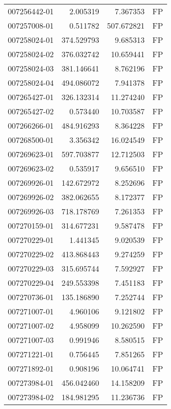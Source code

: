 \begin{tabular}{lrrl}
007256442-01 &    2.005319 &       7.367353 &   FP \\
007257008-01 &    0.511782 &     507.672821 &   FP \\
007258024-01 &  374.529793 &       9.685313 &   FP \\
007258024-02 &  376.032742 &      10.659441 &   FP \\
007258024-03 &  381.146641 &       8.762196 &   FP \\
007258024-04 &  494.086072 &       7.941378 &   FP \\
007265427-01 &  326.132314 &      11.274240 &   FP \\
007265427-02 &    0.573440 &      10.703587 &   FP \\
007266266-01 &  484.916293 &       8.364228 &   FP \\
007268500-01 &    3.356342 &      16.024549 &   FP \\
007269623-01 &  597.703877 &      12.712503 &   FP \\
007269623-02 &    0.535917 &       9.656510 &   FP \\
007269926-01 &  142.672972 &       8.252696 &   FP \\
007269926-02 &  382.062655 &       8.172377 &   FP \\
007269926-03 &  718.178769 &       7.261353 &   FP \\
007270159-01 &  314.677231 &       9.587478 &   FP \\
007270229-01 &    1.441345 &       9.020539 &   FP \\
007270229-02 &  413.868443 &       9.274259 &   FP \\
007270229-03 &  315.695744 &       7.592927 &   FP \\
007270229-04 &  249.553398 &       7.451183 &   FP \\
007270736-01 &  135.186890 &       7.252744 &   FP \\
007271007-01 &    4.960106 &       9.121802 &   FP \\
007271007-02 &    4.958099 &      10.262590 &   FP \\
007271007-03 &    0.991946 &       8.580515 &   FP \\
007271221-01 &    0.756445 &       7.851265 &   FP \\
007271892-01 &    0.908196 &      10.064741 &   FP \\
007273984-01 &  456.042460 &      14.158209 &   FP \\
007273984-02 &  184.981295 &      11.236736 &   FP \\

\end{tabular}
